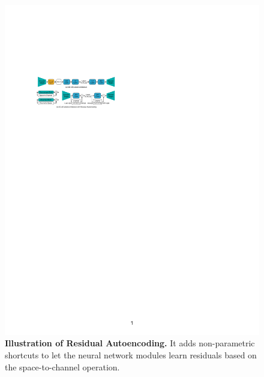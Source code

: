 \begin{figure}[t]
    \centering
    \includegraphics[width=0.9\linewidth]{figures/src/method_arch.pdf}
    \caption{\textbf{Illustration of Residual Autoencoding.} It adds non-parametric shortcuts to let the neural network modules learn residuals based on the space-to-channel operation.}
    \label{fig:method_arch}
\end{figure}